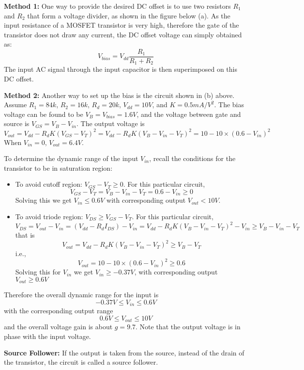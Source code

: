 \begin{itemize}
{\bf Method 1:} One way to provide the desired DC offset is to use two resistors 
$R_1$ and $R_2$ that form a voltage divider, as shown in the figure below (a). As 
the input resistance of a MOSFET transistor is very high, therefore the gate of 
the transistor does not draw any current, the DC offset voltage can simply obtained
as:
\[ V_{bias}=V_{dd}\frac{R_1}{R_1+R_2} \]
The input AC signal through the input capacitor is then superimposed on this DC 
offset. 


{\bf Method 2: } Another way to set up the bias is the circuit shown in (b) above.
Assume $R_1=84k$, $R_2=16k$, $R_d=20k$, $V_{dd}=10V$, and $K=0.5mA/V^2$.  The bias 
voltage can be found to be $V_B=V_{bias}=1.6V$, and the voltage between gate and 
source is $V_{GS}=V_B-V_{in}$. The output voltage is
\[ V_{out}=V_{dd}-R_d K (V_{GS}-V_T)^2=V_{dd}-R_d K (V_B-V_{in}-V_T)^2=10-10\times 
(0.6-V_{in})^2  \]
When $V_{in}=0$, $V_{out}=6.4V$.

To determine the dynamic range of the input $V_{in}$, recall the conditions for the
transistor to be in saturation region:
\begin{itemize}
\item To avoid cutoff region: $V_{GS}-V_T \ge 0$. For this particular circuit, 
  \[ V_{GS}-V_T=V_B-V_{in}-V_T=0.6-V_{in} \ge 0 \]
  Solving this we get $V_{in} \le 0.6V$ with corresponding output $V_{out} < 10V$.

\item To avoid triode region: $V_{DS} \ge V_{GS}-V_T$. For this particular circuit, 
\[  V_{DS}=V_{out}-V_{in}=(V_{dd}-R_dI_{DS})-V_{in}
    =V_{dd}-R_dK (V_B-V_{in}-V_T)^2-V_{in} \ge V_B-V_{in}-V_T  \]
that is
\[  V_{out}=V_{dd}-R_dK (V_B-V_{in}-V_T)^2 \ge V_B-V_T \]
i.e.,
\[  V_{out}=10-10\times (0.6-V_{in})^2 \ge 0.6 \]
Solving this for $V_{in}$ we get $V_{in} \ge -0.37V $, with corresponding output
$V_{out} \ge 0.6V$
\end{itemize}
Therefore the overall dynamic range for the input is 
\[ -0.37V \le V_{in} \le 0.6V \]
with the corresponding output range
\[  0.6V \le V_{out} \le 10V  \]
and the overall voltage gain is about $g=9.7$. Note that the output voltage is in
phase with the input voltage.

{\bf Source Follower: } If the output is taken from the source, instead of the 
drain of the transistor, the circuit is called a source follower. 


\end{itemize}
